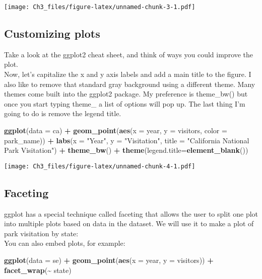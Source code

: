 \documentclass[
]{article}
\newenvironment{Shaded}{\begin{snugshade}}{\end{snugshade}}
\newcommand{\AttributeTok}[1]{\textcolor[rgb]{0.13,0.29,0.53}{#1}}
\newcommand{\FunctionTok}[1]{\textcolor[rgb]{0.13,0.29,0.53}{\textbf{#1}}}
\newcommand{\NormalTok}[1]{#1}
\newcommand{\SpecialCharTok}[1]{\textcolor[rgb]{0.81,0.36,0.00}{\textbf{#1}}}
\newcommand{\StringTok}[1]{\textcolor[rgb]{0.31,0.60,0.02}{#1}}
\begin{document}
\texttt{[image: Ch3\_files/figure-latex/unnamed-chunk-3-1.pdf]}

\subsection{Customizing plots}\label{customizing-plots}

Take a look at the ggplot2 cheat sheet, and think of ways you could
improve the plot.\\
Now, let's capitalize the x and y axis labels and add a main title to
the figure. I also like to remove that standard gray background using a
different theme. Many themes come built into the ggplot2 package. My
preference is theme\_bw() but once you start typing theme\_ a list of
options will pop up. The last thing I'm going to do is remove the legend
title.

\begin{Shaded}
\begin{Highlighting}[]
\FunctionTok{ggplot}\NormalTok{(}\AttributeTok{data =}\NormalTok{ ca) }\SpecialCharTok{+}
 \FunctionTok{geom\_point}\NormalTok{(}\FunctionTok{aes}\NormalTok{(}\AttributeTok{x =}\NormalTok{ year, }\AttributeTok{y =}\NormalTok{ visitors, }\AttributeTok{color =}\NormalTok{ park\_name)) }\SpecialCharTok{+}
 \FunctionTok{labs}\NormalTok{(}\AttributeTok{x =} \StringTok{"Year"}\NormalTok{,}
 \AttributeTok{y =} \StringTok{"Visitation"}\NormalTok{,}
 \AttributeTok{title =} \StringTok{"California National Park Visitation"}\NormalTok{) }\SpecialCharTok{+}
 \FunctionTok{theme\_bw}\NormalTok{() }\SpecialCharTok{+}
 \FunctionTok{theme}\NormalTok{(}\AttributeTok{legend.title=}\FunctionTok{element\_blank}\NormalTok{())}
\end{Highlighting}
\end{Shaded}

\texttt{[image: Ch3\_files/figure-latex/unnamed-chunk-4-1.pdf]}

\subsection{Faceting}\label{faceting}

ggplot has a special technique called faceting that allows the user to
split one plot into multiple plots based on data in the dataset. We will
use it to make a plot of park visitation by state:\\
You can also embed plots, for example:

\begin{Shaded}
\begin{Highlighting}[]
\FunctionTok{ggplot}\NormalTok{(}\AttributeTok{data =}\NormalTok{ se) }\SpecialCharTok{+}
\FunctionTok{geom\_point}\NormalTok{(}\FunctionTok{aes}\NormalTok{(}\AttributeTok{x =}\NormalTok{ year, }\AttributeTok{y =}\NormalTok{ visitors)) }\SpecialCharTok{+}
\FunctionTok{facet\_wrap}\NormalTok{(}\SpecialCharTok{\textasciitilde{}}\NormalTok{ state)}
\end{Highlighting}
\end{Shaded}
\end{document}
